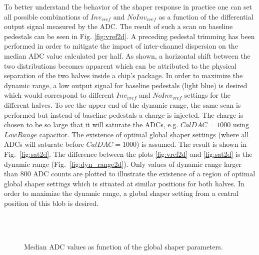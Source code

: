 \documentclass[../../main.tex]{subfiles}
\begin{document}
To better understand the behavior of the shaper response in practice one can set all possible combinations of $Inv_{vref}$ and $NoInv_{vref}$ as a function of the differential output signal measured by the ADC. The result of such a scan on baseline pedestals can be seen in Fig. \ref{fig:vref2d}. A preceding pedestal trimming has been performed in order to mitigate the impact of inter-channel dispersion on the median ADC value calculated per half. As shown, a horizontal shift between the two distributions becomes apparent which can be attributed to the physical separation of the two halves inside a chip's package. In order to maximize the dynamic range, a low output signal for baseline pedestals (light blue) is desired which would correspond to different $Inv_{vref}$ and $NoInv_{vref}$ settings for the different halves. To see the upper end of the dynamic range, the same scan is performed but instead of baseline pedestals a charge is injected. The charge is chosen to be so large that it will saturate the ADCs, e.g. $CalDAC=1000$ using $LowRange$ capacitor. The existence of optimal global shaper settings (where all ADCs will saturate before $CalDAC=1000$) is assumed. The result is shown in Fig.~\ref{fig:sat2d}. The difference between the plots \ref{fig:vref2d} and \ref{fig:sat2d} is the dynamic range (Fig.~\ref{fig:dyn_range2d}). Only values of dynamic range larger than 800 ADC counts are plotted to illustrate the existence of a region of optimal global shaper settings which is situated at similar positions for both halves. In order to maximize the dynamic range, a global shaper setting from a central position of this blob is desired.

\begin{figure}[htp]
	\centering
		\\
		\\
		\caption{Median ADC values as function of the global shaper parameters.}
\end{figure}
\end{document}
